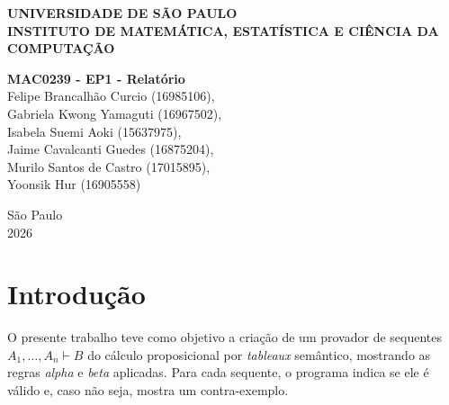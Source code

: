\documentclass[12pt,a4paper]{article}
\begin{document}
\begin{titlepage}
    \begin{center}
        {\large \textbf{UNIVERSIDADE DE SÃO PAULO}} \\
        {\large \textbf{INSTITUTO DE MATEMÁTICA, ESTATÍSTICA E CIÊNCIA DA COMPUTAÇÃO}} \\

        \vspace{5cm}
        \vfill

        \begin{minipage}{0.8\textwidth}
            \centering
            {\Large \textbf{MAC0239 - EP1 - Relatório}} \\
            \vspace{0.8cm}
            {\large
            Felipe Brancalhão Curcio (16985106),\\
            Gabriela Kwong Yamaguti (16967502),\\
            Isabela Suemi Aoki (15637975),\\
            Jaime Cavalcanti Guedes (16875204),\\
            Murilo Santos de Castro (17015895),\\
            Yoonsik Hur (16905558)}
        \end{minipage}

        \vfill
        \vfill

        {\large São Paulo} \\
        {\large 2026}
    \end{center}

    \vspace*{\fill}
\end{titlepage}

\newpage
\tableofcontents
\thispagestyle{empty}

\newpage
{}

\section{Introdução}

O presente trabalho teve como objetivo a criação de um provador de sequentes $A_1, \dots, A_n \vdash B$ do cálculo proposicional por \textit{tableaux} semântico, mostrando as regras \textit{alpha} e \textit{beta} aplicadas. Para cada sequente, o programa indica se ele é válido e, caso não seja, mostra um contra-exemplo.
\end{document}
